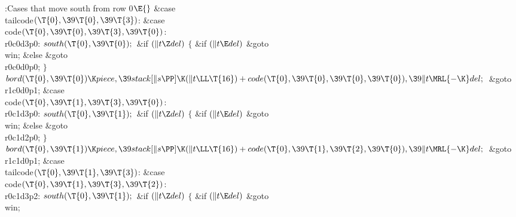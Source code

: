 \B{}:Cases that move south from row 0\X${}\E{}$\6
\4\&{case} \\{tailcode}${}(\T{0},\39\T{0},\39\T{3}){}$:\5
\&{case} \\{code}${}(\T{0},\39\T{0},\39\T{3},\39\T{0}){}$:\5
\\{r0c0d3p0}:\5
${}\\{south}(\T{0},\39\T{0});{}$\6
\&{if} ${}(\|t\Z\\{del}){}$\5
${}\{{}$\5
\1\&{if} ${}(\|t\E\\{del}){}$\1\5
\&{goto} \\{win};\5
\2\&{else}\1\5
\&{goto} \\{r0c0d0p0};\5
\2${}\}{}$\2\6
${}\\{bord}(\T{0},\39\T{0})\K\\{piece},\39\\{stack}[\|s\PP]\K(\|t\LL\T{16})+%
\\{code}(\T{0},\39\T{0},\39\T{0},\39\T{0}),\39\|t\MRL{-{\K}}\\{del};{}$\6
\&{goto} \\{r1c0d0p1};\6
\4\&{case} \\{code}${}(\T{0},\39\T{1},\39\T{3},\39\T{0}){}$:\5
\\{r0c1d3p0}:\5
${}\\{south}(\T{0},\39\T{1});{}$\6
\&{if} ${}(\|t\Z\\{del}){}$\5
${}\{{}$\5
\1\&{if} ${}(\|t\E\\{del}){}$\1\5
\&{goto} \\{win};\5
\2\&{else}\1\5
\&{goto} \\{r0c1d2p0};\5
\2${}\}{}$\2\6
${}\\{bord}(\T{0},\39\T{1})\K\\{piece},\39\\{stack}[\|s\PP]\K(\|t\LL\T{16})+%
\\{code}(\T{0},\39\T{1},\39\T{2},\39\T{0}),\39\|t\MRL{-{\K}}\\{del};{}$\6
\&{goto} \\{r1c1d0p1};\6
\4\&{case} \\{tailcode}${}(\T{0},\39\T{1},\39\T{3}){}$:\5
\&{case} \\{code}${}(\T{0},\39\T{1},\39\T{3},\39\T{2}){}$:\5
\\{r0c1d3p2}:\5
${}\\{south}(\T{0},\39\T{1});{}$\6
\&{if} ${}(\|t\Z\\{del}){}$\5
${}\{{}$\5
\1\&{if} ${}(\|t\E\\{del}){}$\1\5
\&{goto} \\{win};\5

